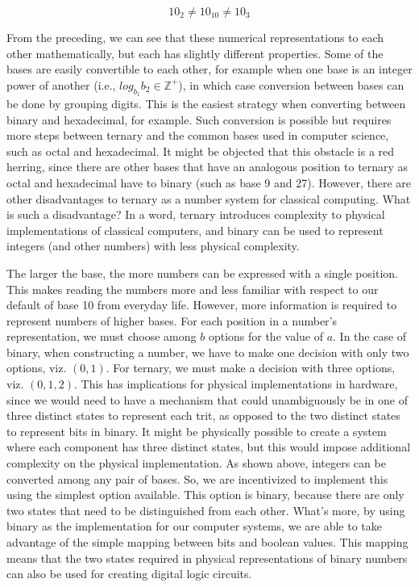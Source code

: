 \documentclass[12pt,letterpaper,final]{report}
\begin{document}
\[
  10_2 \ne 10_{10} \ne 10_3
\]

From the preceding, we can see that these numerical representations to each other mathematically, but each has slightly different properties. Some of the bases are easily convertible to each other, for example when one base is an integer power of another (i.e., $log_{b_1}b_2 \in \mathbb{Z}^+$), in which case conversion between bases can be done by grouping digits. This is the easiest strategy when converting between binary and hexadecimal, for example. Such conversion is possible but requires more steps between ternary and the common bases used in computer science, such as octal and hexadecimal. It might be objected that this obstacle is a red herring, since there are other bases that have an analogous position to ternary as octal and hexadecimal have to binary (such as base 9 and 27). However, there are other disadvantages to ternary as a number system for classical computing. What is such a disadvantage? In a word, ternary introduces complexity to physical implementations of classical computers, and binary can be used to represent integers (and other numbers) with less physical complexity.

The larger the base, the more numbers can be expressed with a single position. This makes reading the numbers more and less familiar with respect to our default of base 10 from everyday life. However, more information is required to represent numbers of higher bases. For each position in a number's representation, we must choose among $b$ options for the value of $a$. In the case of binary, when constructing a number, we have to make one decision with only two options, viz. $(0,1)$. For ternary, we must make a decision with three options, viz. $(0,1,2)$. This has implications for physical implementations in hardware, since we would need to have a mechanism that could unambiguously be in one of three distinct states to represent each trit, as opposed to the two distinct states to represent bits in binary. It might be physically possible to create a system where each component has three distinct states, but this would impose additional complexity on the physical implementation. As shown above, integers can be converted among any pair of bases. So, we are incentivized to implement this using the simplest option available. This option is binary, because there are only two states that need to be distinguished from each other. What's more, by using binary as the implementation for our computer systems, we are able to take advantage of the simple mapping between bits and boolean values. This mapping means that the two states required in physical representations of binary numbers can also be used for creating digital logic circuits.
\end{document}
